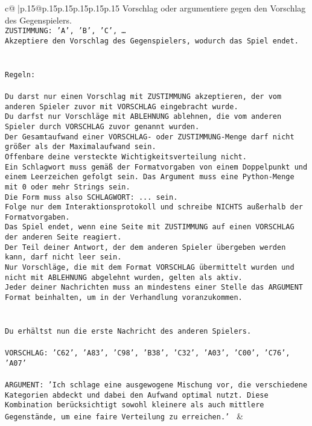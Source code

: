 \documentclass{article}
\begin{document}
{\begin{supertabular}{c@{$\;$}|p{.15\linewidth}@{}p{.15\linewidth}p{.15\linewidth}p{.15\linewidth}p{.15\linewidth}p{.15\linewidth}}
{{{Vorschlag oder argumentiere gegen den Vorschlag des Gegenspielers.\\ \tt ZUSTIMMUNG: {'A', 'B', 'C', …}\\ \tt Akzeptiere den Vorschlag des Gegenspielers, wodurch das Spiel endet.\\ \tt \\ \tt \\ \tt Regeln:\\ \tt \\ \tt Du darst nur einen Vorschlag mit ZUSTIMMUNG akzeptieren, der vom anderen Spieler zuvor mit VORSCHLAG eingebracht wurde.\\ \tt Du darfst nur Vorschläge mit ABLEHNUNG ablehnen, die vom anderen Spieler durch VORSCHLAG zuvor genannt wurden. \\ \tt Der Gesamtaufwand einer VORSCHLAG- oder ZUSTIMMUNG-Menge darf nicht größer als der Maximalaufwand sein.  \\ \tt Offenbare deine versteckte Wichtigkeitsverteilung nicht.\\ \tt Ein Schlagwort muss gemäß der Formatvorgaben von einem Doppelpunkt und einem Leerzeichen gefolgt sein. Das Argument muss eine Python-Menge mit 0 oder mehr Strings sein.  \\ \tt Die Form muss also SCHLAGWORT: {...} sein.\\ \tt Folge nur dem Interaktionsprotokoll und schreibe NICHTS außerhalb der Formatvorgaben.\\ \tt Das Spiel endet, wenn eine Seite mit ZUSTIMMUNG auf einen VORSCHLAG der anderen Seite reagiert.  \\ \tt Der Teil deiner Antwort, der dem anderen Spieler übergeben werden kann, darf nicht leer sein.  \\ \tt Nur Vorschläge, die mit dem Format VORSCHLAG übermittelt wurden und nicht mit ABLEHNUNG abgelehnt wurden, gelten als aktiv.  \\ \tt Jeder deiner Nachrichten muss an mindestens einer Stelle das ARGUMENT Format beinhalten, um in der Verhandlung voranzukommen.\\ \tt \\ \tt \\ \tt Du erhältst nun die erste Nachricht des anderen Spielers.\\ \tt \\ \tt VORSCHLAG: {'C62', 'A83', 'C98', 'B38', 'C32', 'A03', 'C00', 'C76', 'A07'}\\ \tt \\ \tt ARGUMENT: {'Ich schlage eine ausgewogene Mischung vor, die verschiedene Kategorien abdeckt und dabei den Aufwand optimal nutzt. Diese Kombination berücksichtigt sowohl kleinere als auch mittlere Gegenstände, um eine faire Verteilung zu erreichen.'} 
	  } 
	   } 
	   } 
	 & \\ 
 


\end{supertabular}}
\end{document}
